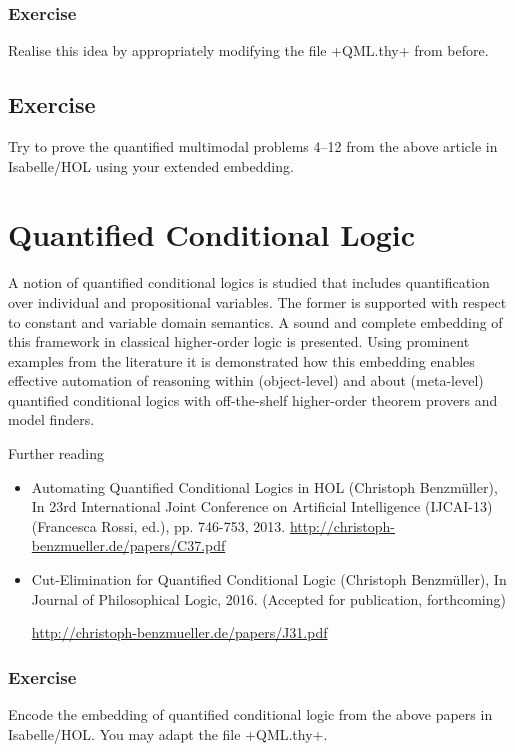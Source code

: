 \documentclass{article}
\begin{document}
\subsubsection{Exercise}
Realise this idea by appropriately modifying the file +QML.thy+ from
before.

\subsection{Exercise}
Try to prove the quantified multimodal problems 4--12 from the above article in Isabelle/HOL
using your extended embedding.


\section{Quantified Conditional Logic}
  A notion of quantified conditional logics is studied that
  includes quantification over individual and propositional
  variables. The former is supported with respect to constant and
  variable domain semantics.  A sound and complete
  embedding of this framework in classical higher-order logic is
  presented. Using prominent examples from the literature it is
  demonstrated how this embedding enables effective automation of
  reasoning within (object-level) and about (meta-level) quantified
  conditional logics with off-the-shelf higher-order theorem provers
  and model
  finders. 

Further reading
\begin{itemize}
\item Automating Quantified Conditional Logics in HOL (Christoph
  Benzmüller), In 23rd International Joint Conference on Artificial
  Intelligence (IJCAI-13) (Francesca Rossi, ed.), pp. 746-753, 2013.
  \href{http://christoph-benzmueller.de/papers/C37.pdf}{http://christoph-benzmueller.de/papers/C37.pdf}
\item Cut-Elimination for Quantified Conditional Logic (Christoph
  Benzmüller), In Journal of Philosophical Logic, 2016. (Accepted for
  publication, forthcoming) 

\href{http://christoph-benzmueller.de/papers/J31.pdf}{http://christoph-benzmueller.de/papers/J31.pdf}
\end{itemize}

\subsubsection{Exercise}
Encode the embedding of quantified conditional logic from the above
papers in Isabelle/HOL. You may adapt the file +QML.thy+.
\end{document}

